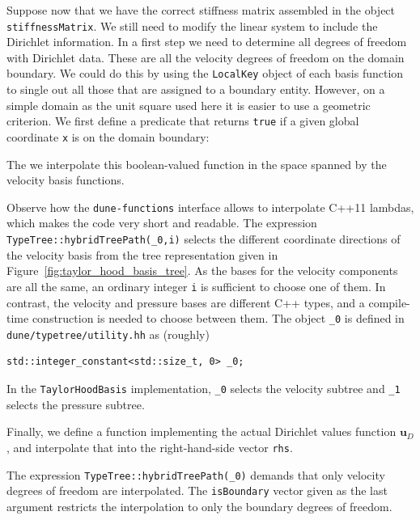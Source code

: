 \documentclass[a4paper,10pt,headings=normal,bibliography=totoc]{scrartcl}
\newcommand{\cpp}[1]{\lstinline[basicstyle=\ttfamily]!#1!}
\newcommand{\dunemodule}[1]{\texttt{#1}}
\newcommand{\file}[1]{\texttt{#1}}
\begin{document}
Suppose now that we have the correct stiffness matrix assembled in the object \cpp{stiffnessMatrix}.  We still need
to modify the linear system to include the Dirichlet information.
In a first step we need to determine all degrees of freedom with Dirichlet data.  These are all the velocity degrees of freedom
on the domain boundary.  We could do this by using the \cpp{LocalKey} object of each basis function
to single out all those that are assigned to a boundary entity.  However, on a simple domain as the unit square
used here it is easier to use a geometric criterion.  We first define a predicate that returns \cpp{true}
if a given global coordinate \cpp{x} is on the domain boundary:
%

%
The we interpolate this boolean-valued function in the space spanned by the velocity basis functions.
%

%
Observe how the \dunemodule{dune-functions} interface allows to interpolate C++11 lambdas, which makes the code
very short and readable.  The expression \cpp{TypeTree::hybridTreePath(_0,i)} selects the different coordinate
directions of the velocity basis from the tree representation given in Figure~\ref{fig:taylor_hood_basis_tree}.
As the bases for the velocity components are all the same, an ordinary integer \cpp{i} is sufficient to choose
one of them.  In contrast, the velocity and pressure bases are different C++ types, and a compile-time
construction is needed to choose between them.  The object \cpp{_0} is defined in
\file{dune/typetree/utility.hh} as (roughly)
\begin{lstlisting}[style=Interface]
std::integer_constant<std::size_t, 0> _0;
\end{lstlisting}
In the \cpp{TaylorHoodBasis} implementation, \cpp{_0} selects the velocity subtree and \cpp{_1} selects
the pressure subtree.

Finally, we define a function implementing the actual Dirichlet values function $\mathbf{u}_D$, and interpolate
that into the right-hand-side vector \cpp{rhs}.
%

%
The expression \cpp{TypeTree::hybridTreePath(_0)} demands that only velocity degrees of freedom are
interpolated.  The \cpp{isBoundary} vector given as the last argument restricts the interpolation
to only the boundary degrees of freedom.
\end{document}
